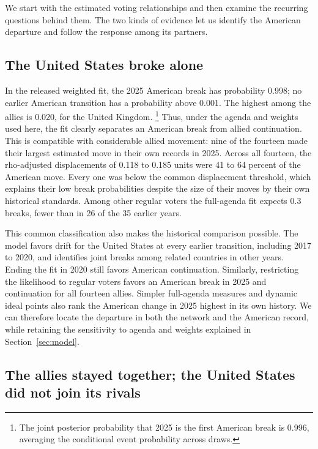 \documentclass[12pt,authoryear]{elsarticle}
\begin{document}
We start with the estimated voting relationships and then examine the recurring questions behind them. The two kinds of evidence let us identify the American departure and follow the response among its partners.

\subsection{The United States broke alone}

In the released weighted fit, the 2025 American break has probability 0.998; no earlier American transition has a probability above 0.001. The highest among the allies is 0.020, for the United Kingdom. \footnote{The joint posterior probability that 2025 is the first American break is 0.996, averaging the conditional event probability across draws.} Thus, under the agenda and weights used here, the fit clearly separates an American break from allied continuation. This is compatible with considerable allied movement: nine of the fourteen made their largest estimated move in their own records in 2025. Across all fourteen, the rho-adjusted displacements of 0.118 to 0.185 units were 41 to 64 percent of the American move. Every one was below the common displacement threshold, which explains their low break probabilities despite the size of their moves by their own historical standards. Among other regular voters the full-agenda fit expects 0.3 breaks, fewer than in 26 of the 35 earlier years.

This common classification also makes the historical comparison possible. The model favors drift for the United States at every earlier transition, including 2017 to 2020, and identifies joint breaks among related countries in other years. Ending the fit in 2020 still favors American continuation. Similarly, restricting the likelihood to regular voters favors an American break in 2025 and continuation for all fourteen allies. Simpler full-agenda measures and dynamic ideal points also rank the American change in 2025 highest in its own history. We can therefore locate the departure in both the network and the American record, while retaining the sensitivity to agenda and weights explained in Section~\ref{sec:model}.

\subsection{The allies stayed together; the United States did not join its rivals}
\end{document}
